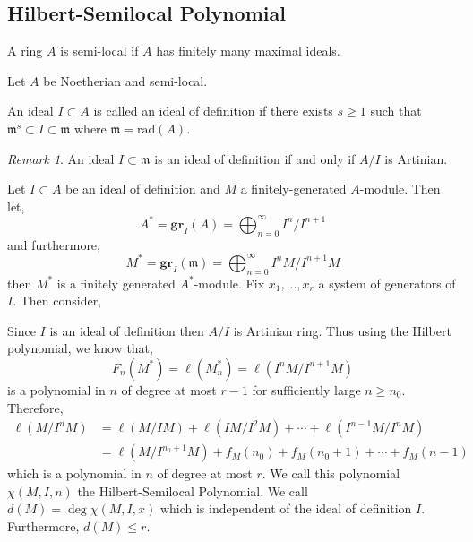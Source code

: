 \documentclass[12pt]{article}
\newcommand{\rad}[1]{\mathrm{rad}\left( #1 \right)}
\newcommand{\gr}[2]{\mathbf{gr}_{#1}\left(#2\right)}
\newcommand{\m}{\mathfrak{m}}
\theoremstyle{remark}
\newtheorem*{remark}{Remark}
\theoremstyle{definition}
\newenvironment{definition}[1][Definition:]{\begin{trivlist}
\item[\hskip \labelsep {\bfseries #1}]}{\end{trivlist}}
\begin{document}
\subsection{Hilbert-Semilocal Polynomial}

\begin{definition}
A ring $A$ is semi-local if $A$ has finitely many maximal ideals.
\end{definition}

Let $A$ be Noetherian and semi-local. 

\begin{definition}
An ideal $I \subset A$ is called an ideal of definition if there exists $s \ge 1$ such that $\m^s \subset I \subset \m$ where $\m = \rad{A}$. 
\end{definition}

\begin{remark}
An ideal $I \subset \m$ is an ideal of definition if and only if $A / I$ is Artinian. 
\end{remark}

\begin{definition}
Let $I \subset A$ be an ideal of definition and $M$ a finitely-generated $A$-module. Then let,
\[ A^* = \gr{I}{A} = \bigoplus_{n = 0}^{\infty} I^n / I^{n+1} \]
and furthermore,
\[ M^* = \gr{I}{\m} = \bigoplus_{n = 0}^\infty I^n M / I^{n+1} M \]
then $M^*$ is a finitely generated $A^*$-module. Fix $x_1, \dots, x_r$ a system of generators of $I$. Then consider,
\begin{center}
\end{center}
Since $I$ is an ideal of definition then $A / I$ is Artinian ring. Thus using the Hilbert polynomial, we know that,
\[ F_n(M^*) = \ell(M_n^*) = \ell(I^n M / I^{n+1}M) \]
is a polynomial in $n$ of degree at most $r - 1$ for sufficiently large $n \ge n_0$. Therefore,
\begin{align*}
\ell(M / I^n M) & = \ell(M/IM) + \ell(IM/I^2M) + \cdots + \ell(I^{n-1}M/I^n M) 
\\
& = \ell(M / I^{n_0 + 1}M) + f_M(n_0) + f_M(n_0 + 1) + \cdots + f_M(n-1) 
\end{align*}
which is a polynomial in $n$ of degree at most $r$. We call this polynomial $\chi(M, I, n)$ the Hilbert-Semilocal Polynomial. We call $d(M) = \deg{\chi(M, I, x)}$ which is independent of the ideal of definition $I$. Furthermore, $d(M) \le r$.   
\end{definition}
\end{document}
